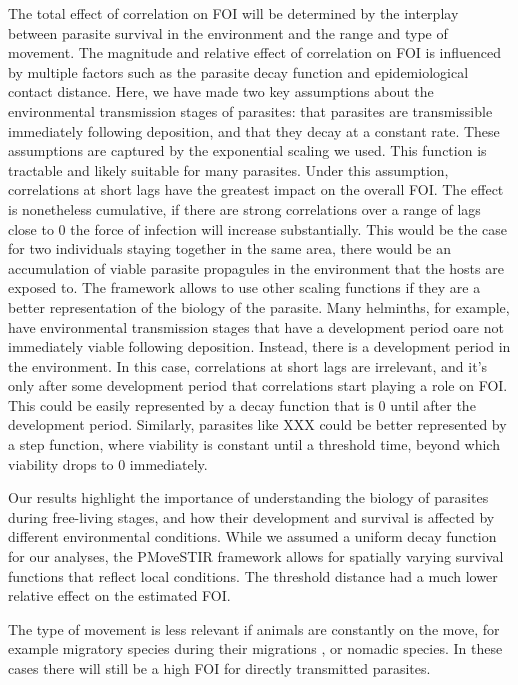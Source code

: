 \documentclass[letterpaper]{article}
\begin{document}
The total effect of correlation on FOI will be determined by the interplay between parasite survival in the environment and the range and type of movement. 
The magnitude and relative effect of correlation on FOI is influenced by multiple factors such as the parasite decay function and epidemiological contact distance. 
Here, we have made two key assumptions about the environmental transmission stages of parasites: that parasites are transmissible immediately following deposition, and that they decay at a constant rate. 
These assumptions are captured by the exponential scaling we used. This function is tractable and likely suitable for many parasites. Under this assumption, correlations at short lags have the greatest impact on the overall FOI. The effect is nonetheless cumulative, if there are strong correlations over a range of lags close to 0 the force of infection will increase substantially. This would be the case for two individuals staying together in the same area, there would be an accumulation of viable parasite propagules in the environment that the hosts are exposed to. 
The framework allows to use other scaling functions if they are a better representation of the biology of the parasite. 
Many helminths, for example, have environmental transmission stages that have a development period oare not immediately viable following deposition. Instead, there is a development period in the environment. In this case, correlations at short lags are irrelevant, and it's only after some development period that correlations start playing a role on FOI. This could be easily represented by a decay function that is 0 until after the development period. Similarly, parasites like XXX could be better represented by a step function, where viability is constant until a threshold time, beyond which viability drops to 0 immediately. 

Our results highlight the importance of understanding the biology of parasites during free-living stages, and how their development and survival is affected by different environmental conditions. While we assumed a uniform decay function for our analyses, the PMoveSTIR framework allows for spatially varying survival functions that reflect local conditions. 
The threshold distance had a much lower relative effect on the estimated FOI.


The type of movement is less relevant if animals are constantly on the move, for example migratory species during their migrations \citep{Peacock2018}, or nomadic species. In these cases there will still be a high FOI for directly transmitted parasites.
\end{document}
